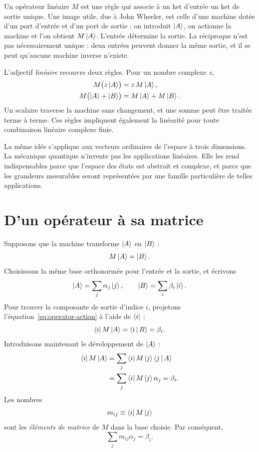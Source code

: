 Un opérateur linéaire \(M\) est une règle qui associe à un ket d’entrée un ket de sortie unique. Une image utile, due à John Wheeler, est celle d’une machine dotée d’un port d’entrée et d’un port de sortie : on introduit \(\left\lvert A\right\rangle\), on actionne la machine et l’on obtient \(M\left\lvert A\right\rangle\). L’entrée détermine la sortie. La réciproque n’est pas nécessairement unique : deux entrées peuvent donner la même sortie, et il se peut qu’aucune machine inverse n’existe.

L’adjectif \emph{linéaire} recouvre deux règles. Pour un nombre complexe \(z\),
\begin{align}
M\bigl(z\left\lvert A\right\rangle\bigr)&=z\,M\left\lvert A\right\rangle, \label{eq:operator-homogeneous}\\
M\bigl(\left\lvert A\right\rangle+\left\lvert B\right\rangle\bigr)&=M\left\lvert A\right\rangle+M\left\lvert B\right\rangle.
\label{eq:operator-additive}
\end{align}
Un scalaire traverse la machine sans changement, et une somme peut être traitée terme à terme. Ces règles impliquent également la linéarité pour toute combinaison linéaire complexe finie.

La même idée s’applique aux vecteurs ordinaires de l’espace à trois dimensions. La mécanique quantique n’invente pas les applications linéaires. Elle les rend indispensables parce que l’espace des états est abstrait et complexe, et parce que les grandeurs mesurables seront représentées par une famille particulière de telles applications.

\section{D’un opérateur à sa matrice}

Supposons que la machine transforme \(\left\lvert A\right\rangle\) en \(\left\lvert B\right\rangle\) :
\begin{equation}
M\left\lvert A\right\rangle=\left\lvert B\right\rangle.
\label{eq:operator-action}
\end{equation}
Choisissons la même base orthonormée pour l’entrée et la sortie, et écrivons
\[
\left\lvert A\right\rangle=\sum_j\alpha_j\left\lvert j\right\rangle,
\qquad
\left\lvert B\right\rangle=\sum_i\beta_i\left\lvert i\right\rangle.
\]
Pour trouver la composante de sortie d’indice \(i\), projetons l’équation~\eqref{eq:operator-action} à l’aide de \(\left\langle i\right\rvert\) :
\begin{equation}
\left\langle i\right\rvert M\left\lvert A\right\rangle=\left\langle i\,\middle|\,B\right\rangle=\beta_i.
\end{equation}
Introduisons maintenant le développement de \(\left\lvert A\right\rangle\) :
\begin{align}
\left\langle i\right\rvert M\left\lvert A\right\rangle
 &=\sum_j\left\langle i\right\rvert M\left\lvert j\right\rangle\left\langle j\,\middle|\,A\right\rangle\\
 &=\sum_j\left\langle i\right\rvert M\left\lvert j\right\rangle\alpha_j
 =\beta_i.
\end{align}
Les nombres
\begin{equation}
m_{ij}\equiv\left\langle i\right\rvert M\left\lvert j\right\rangle
\label{eq:matrix-elements}
\end{equation}
sont les \emph{éléments de matrice} de \(M\) dans la base choisie. Par conséquent,
\begin{equation}
\boxed{\sum_jm_{ij}\alpha_j=\beta_i.}
\label{eq:component-action}
\end{equation}

